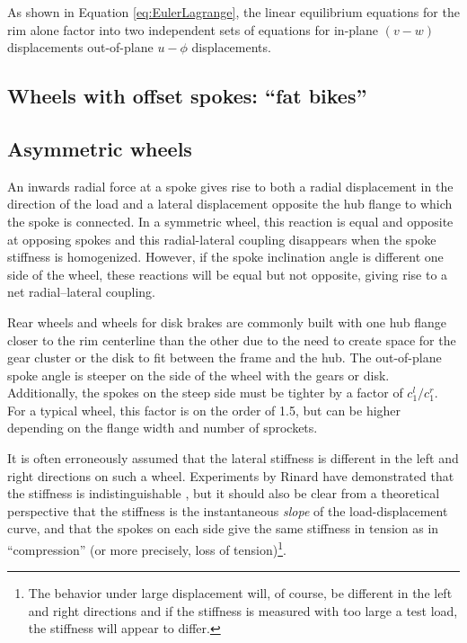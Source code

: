 \documentclass[\rootdir/thesis.tex]{subfiles}
\begin{document}
As shown in Equation \eqref{eq:EulerLagrange}, the linear equilibrium equations for the rim alone factor into two independent sets of equations for in-plane $(v-w)$ displacements out-of-plane $u-\phi$ displacements. 

\subsection{Wheels with offset spokes: ``fat bikes''}



\subsection{Asymmetric wheels}

An inwards radial force at a spoke gives rise to both a radial displacement in the direction of the load and a lateral displacement opposite the hub flange to which the spoke is connected. In a symmetric wheel, this reaction is equal and opposite at opposing spokes and this radial-lateral coupling disappears when the spoke stiffness is homogenized. However, if the spoke inclination angle is different one side of the wheel, these reactions will be equal but not opposite, giving rise to a net radial--lateral coupling.

Rear wheels and wheels for disk brakes are commonly built with one hub flange closer to the rim centerline than the other due to the need to create space for the gear cluster or the disk to fit between the frame and the hub. The out-of-plane spoke angle is steeper on the side of the wheel with the gears or disk. Additionally, the spokes on the steep side must be tighter by a factor of $c_1^l/c_1^r$. For a typical wheel, this factor is on the order of 1.5, but can be higher depending on the flange width and number of sprockets.

It is often erroneously assumed that the lateral stiffness is different in the left and right directions on such a wheel. Experiments by Rinard have demonstrated that the stiffness is indistinguishable \cite{Rinard}, but it should also be clear from a theoretical perspective that the stiffness is the instantaneous \emph{slope} of the load-displacement curve, and that the spokes on each side give the same stiffness in tension as in ``compression'' (or more precisely, loss of tension)\footnote{The behavior under large displacement will, of course, be different in the left and right directions and if the stiffness is measured with too large a test load, the stiffness will appear to differ.}.
\end{document}
